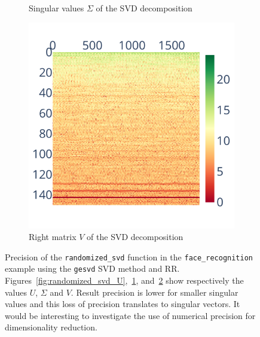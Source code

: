 \documentclass[10pt,journal,compsoc]{IEEEtran}
\DeclareRobustCommand{\add}[1]{\textcolor{ao(english)}{#1}}%
\DeclareRobustCommand{\add}[1]{#1}
\begin{document}
\begin{figure}
\begin{subfigure}{0.3\linewidth}
        \caption{Singular values $\Sigma$ of the SVD decomposition}
        \label{fig:randomized_svd_S}
    \end{subfigure}
    \begin{subfigure}{0.3\linewidth}
        \includegraphics[width=\linewidth]{figure/face_recognition/randomized_svd_ret_V_sig.pdf}
        \caption{Right matrix $V$ of the SVD decomposition}
        \label{fig:randomized_svd_V}
    \end{subfigure}
    \caption{Precision of the \texttt{randomized\_svd} function in the
        \texttt{face\_recognition} example using the \texttt{gesvd} SVD method
        and RR. Figures~\ref{fig:randomized_svd_U},~\ref{fig:randomized_svd_S},
        and~\ref{fig:randomized_svd_V} show respectively the values $U$,
        $\Sigma$ and $V$. \add{Result} precision is lower for smaller singular
        values and this loss of precision translates to singular vectors. It
        would be interesting to investigate the use of numerical precision for
        dimensionality reduction. }
    \label{fig:face_recognition_svd}
\end{figure}
\end{document}
